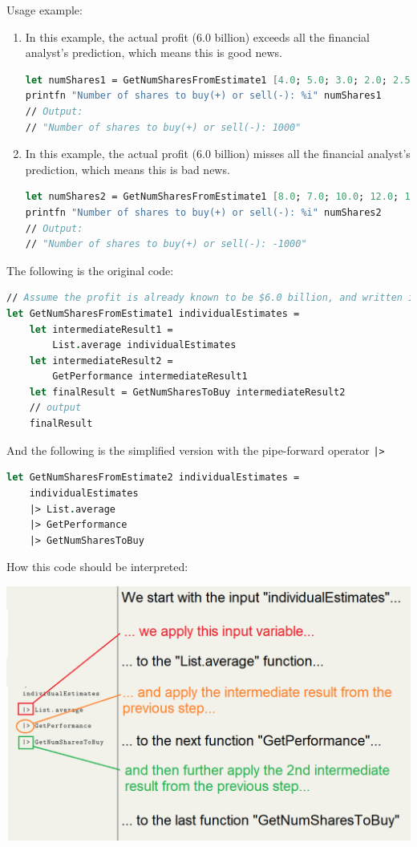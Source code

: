\documentclass[12pt]{article}
\begin{document}
Usage example:
\begin{enumerate}
\item In this example, the actual profit (6.0 billion) exceeds all the financial analyst's prediction, which means this is good news.
\begin{lstlisting}[language=FSharp]
let numShares1 = GetNumSharesFromEstimate1 [4.0; 5.0; 3.0; 2.0; 2.5]
printfn "Number of shares to buy(+) or sell(-): %i" numShares1
// Output:
// "Number of shares to buy(+) or sell(-): 1000"
\end{lstlisting}
\item In this example, the actual profit (6.0 billion) misses all the financial analyst's prediction, which means this is bad news.
\begin{lstlisting}[language=FSharp]
let numShares2 = GetNumSharesFromEstimate1 [8.0; 7.0; 10.0; 12.0; 10.5]
printfn "Number of shares to buy(+) or sell(-): %i" numShares2
// Output:
// "Number of shares to buy(+) or sell(-): -1000"
\end{lstlisting}
\end{enumerate}
The following is the original code:
\begin{lstlisting}[language=FSharp]
// Assume the profit is already known to be $6.0 billion, and written in "GetPerformance"
let GetNumSharesFromEstimate1 individualEstimates =
    let intermediateResult1 = 
        List.average individualEstimates
    let intermediateResult2 = 
        GetPerformance intermediateResult1
    let finalResult = GetNumSharesToBuy intermediateResult2
    // output
    finalResult
\end{lstlisting}
And the following is the simplified version with the pipe-forward operator \texttt{|>}

\begin{lstlisting}[language=FSharp]
let GetNumSharesFromEstimate2 individualEstimates =
    individualEstimates                 
    |> List.average                     
    |> GetPerformance                  
    |> GetNumSharesToBuy  
\end{lstlisting}

How this code should be interpreted:
\begin{center}
\includegraphics[width=14cm]{pictures/picture25.png}
\end{center}   
\end{document}
